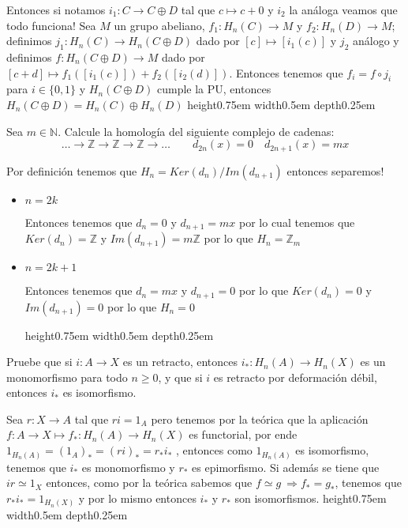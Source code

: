 \documentclass[11pt,a4paper,oneside]{article}
\newcommand{\N}{{\mathbb{N}}}
\newcommand{\sett}[1]{\{#1\}}
\newcommand{\Z}{\mathbb{Z}}
\def \ge{\geqslant}
\newenvironment{proof}[1][Demostraci\'on]{\begin{trivlist}
\item[\hskip \labelsep {\bfseries #1}]}{\end{trivlist}}
\newenvironment{remark}[1][Observaci\'on]{\begin{trivlist}
\item[\hskip \labelsep {\bfseries #1}]}{\end{trivlist}}
\newcommand{\qed}{\nobreak \ifvmode \relax \else
      \ifdim\lastskip<1.5em \hskip-\lastskip
      \hskip1.5em plus0em minus0.5em \fi \nobreak
      \vrule height0.75em width0.5em depth0.25em\fi}
\begin{document}
\begin{enumerate}
\begin{proof}
\begin{remark}
\end{remark}

Entonces si notamos $i_1 : C \rightarrow C \oplus D$ tal que $c \mapsto c+0$ y $i_2$ la an\'aloga veamos que todo funciona! Sea $M$ un grupo abeliano, $f_1: H_n(C) \rightarrow M$ y $f_2: H_n(D) \rightarrow M$; definimos $j_1 : H_n(C) \rightarrow H_n(C \oplus D)$ dado por $[c] \mapsto [i_1(c)]$ y $j_2$ an\'alogo y definimos $f:H_n(C \oplus D) \rightarrow M$ dado por $[c + d] \mapsto f_1([i_1(c)]) + f_2([i_2(d)])$. Entonces tenemos que $f_i = f \circ  j_i$ para $i \in \sett{0,1}$ y $H_n(C \oplus D)$ cumple la PU, entonces $H_n(C \oplus D) = H_n(C) \oplus H_n(D)$ \qed

\end{proof}

\item
Sea $m\in\N$. Calcule la homolog\'ia del siguiente complejo de cadenas:
$$\dots\to\Z\to\Z\to\Z\to\dots \qquad d_{2n}(x)=0 \quad d_{2n+1}(x)=mx$$

\begin{proof}

Por definici\'on tenemos que $H_n = Ker (d_n) / Im (d_{n+1})$ entonces separemos!

\begin{itemize}
\item {$n=2k$}

Entonces tenemos que $d_n=0$ y $d_{n+1}=mx$ por lo cual tenemos que $Ker(d_n) = \Z$ y $Im(d_{n+1}) = m\Z $ por lo que $H_n = \Z_m$

\item {$n = 2k+1$}

Entonces tenemos que $d_n = mx$ y $d_{n+1} = 0$ por lo que $Ker(d_n) = 0$ y $Im(d_{n+1}) = 0$ por lo que $H_n = 0$

\qed

\end{itemize}

\end{proof}

\item
Pruebe que si $i:A\rightarrow X$ es un retracto, entonces $i_*:H_n(A)\to H_n(X)$ es un monomorfismo para todo $n\ge 0$, y que si $i$ es retracto por deformaci\'on d\'ebil, entonces $i_*$ es isomorfismo.

\begin{proof}

Sea $r:X \rightarrow A$ tal que $ri = 1_A$ pero tenemos por la te\'orica que la aplicaci\'on $f:A \rightarrow X \mapsto f_*: H_n(A) \rightarrow H_n(X)$ es functorial, por ende $1_{H_n(A)}=(1_A)_* = (ri)_* = r_* i_*$ , entonces como $1_{H_n(A)}$ es isomorfismo, tenemos que $i_*$ es monomorfismo y $r_*$ es epimorfismo. Si adem\'as se tiene que $ir \simeq 1_X$ entonces, como por la te\'orica sabemos que $f \simeq g \ \Longrightarrow f_* = g_*$, tenemos que $r_* i_* = 1_{H_n(X)}$ y por lo mismo entonces $i_*$ y $r_*$ son isomorfismos. \qed


\end{proof}
\end{enumerate}
\end{document}
